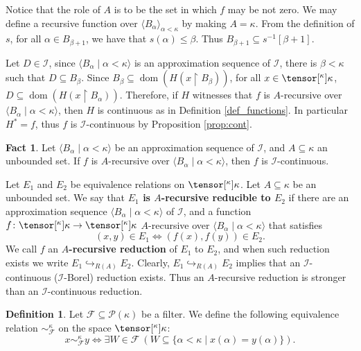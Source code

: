 \documentclass{amsart}
\numberwithin{equation}{section}
\renewcommand{\subset}{\subseteq}
\newcommand{\I}{\mathcal{I}}
\newcommand{\pre}[2]{\tensor[^{#1}]{#2}{}}
\newcommand{\seq}[2]{\langle #1 \mid #2 \rangle}
\newcommand{\markdef}[1]{\textbf{#1}}
\newcommand{\1}{\mathbf{I}}
\newcommand{\2}{\mathbf{II}}
\renewcommand{\k}{\kappa}
\DeclareMathOperator{\dom}{dom}
\theoremstyle{definition}
\newtheorem{definition}[theorem]{Definition}
\newtheorem{fact}[theorem]{Fact}
\theoremstyle{remark}
\begin{document}
Notice that the role of $A$ is to be the set in which $f$ may be not zero. We may define a recursive function over $\langle B_\alpha\rangle_{\alpha<\kappa}$ by making $A=\kappa$. From the definition of $s$, for all $\alpha\in B_{\beta+1}$, we have that $s(\alpha)\leq \beta$. Thus $B_{\beta+1}\subset s^{-1}[\beta+1]$. 

Let $D\in \I$, since $\seq{B_\alpha}{\alpha<\kappa}$ is an approximation sequence of $\mathcal{I}$, there is $\beta<\kappa$ such that $D\subseteq B_\beta$. Since $B_{\beta}\subseteq \dom (H(x\restriction B_\beta))$, for all $x\in \pre{\k}{\kappa}$, $D\subseteq \dom (H(x\restriction B_\alpha))$.
Therefore, if \(H\) witnesses that $f$ is $A$-recursive over $\seq{B_\alpha}{\alpha<\kappa}$, then $H$ is continuous as in Definition \ref{def_functions}. In particular \(H^*=f\), %
thus \(f\) is \(\I\)-continuous by Proposition \ref{prop:cont}. 

\begin{fact}
    Let $\seq{B_\alpha}{\alpha<\kappa}$ be an approximation sequence of $\mathcal{I}$, and $A\subseteq \kappa$ an unbounded set. If $f$ is $A$-recursive over $\seq{B_\alpha}{\alpha<\kappa}$, then $f$ is \(\I\)-continuous.
\end{fact}


Let $E_1$ and $E_2$ be equivalence relations on $\pre{\k}{\kappa}$. Let $A\subseteq \kappa$ be an unbounded set.
We say that \markdef{$E_1$ is $A$-recursive reducible to $E_2$} if there are an approximation sequence $\seq{B_\alpha}{\alpha<\kappa}$ of $\mathcal{I}$, and a function $f\colon
\pre{\k}{\kappa}\rightarrow \pre{\k}{\kappa}$ $A$-recursive over $\seq{B_\alpha}{\alpha<\kappa}$ that satisfies $$(x,y)\in E_1 \Leftrightarrow
(f(x),f(y))\in E_2.$$  We call $f$ an \markdef{$A$-recursive reduction} of $E_1$ to
$E_2$, and when such reduction exists we write $E_1\hookrightarrow_{R(A)} E_2$. Clearly, $E_1\hookrightarrow_{R(A)} E_2$ implies that an \(\I\)-continuous (\(\I\)-Borel) reduction exists.
Thus an $A$-recursive reduction is stronger than an \(\I\)-continuous reduction.

\begin{definition}\label{def:filter_relation}
    Let $\mathcal{F}\subseteq \mathcal{P}(\kappa)$ be a filter. %
    We define the following equivalence relation $\sim_\mathcal{F}^{\kappa}$ on the space $\pre{\k}{\kappa}$: 
    $$x \sim^{\kappa}_\mathcal{F}y\Leftrightarrow \exists W\in\mathcal{F}\ \left( W\subseteq \{\alpha<\kappa\mid x(\alpha)=y(\alpha)\}\right).$$
\end{definition}
\end{document}
